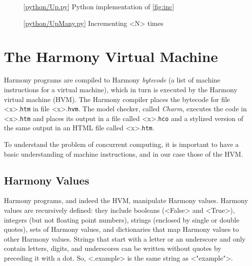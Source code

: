 \documentclass{report}
\newcommand{\harmonylink}[1]{%
[\href{https://harmony.cs.cornell.edu/#1}{\underline{#1}}]%
}
\newenvironment{code}{
\tcolorbox
}{
\endtcolorbox
}
\begin{document}
\begin{figure}
\begin{code}
\end{code}
\caption{\harmonylink{python/Up.py} Python implementation of \autoref{fig:inc}}
\label{fig:incpy}
\end{figure}

\begin{figure}
\begin{code}
\end{code}
\caption{\harmonylink{python/UpMany.py} Incrementing <{N}> times}
\label{fig:incmany}
\end{figure}

\chapter{The Harmony Virtual Machine}
\label{ch:harmonymachine}
%

Harmony programs are compiled to Harmony \emph{bytecode}
%
(a list of machine instructions for a virtual machine),
which in turn is executed by the Harmony virtual machine (HVM).
%
%
%
The Harmony compiler places the bytecode for file <{x}>.\texttt{htm} in
file <{x}>.\texttt{hvm}.
The model checker, called \emph{Charm}, executes the code in
<{x}>.\texttt{htm} and places its output in a file
called <{x}>.\texttt{hco} and a stylized version of the same output
in an HTML file called <{x}>.\texttt{htm}.

To understand the problem of concurrent computing, it
is important to have a basic understanding of machine instructions,
and in our case those of the HVM.

\section*{Harmony Values}

Harmony programs, and indeed the HVM,  manipulate Harmony values.
Harmony values are recursively defined:
they include booleans (<{False}> and <{True}>),
integers (but not floating point numbers),
strings (enclosed by single or double quotes),
sets of Harmony values, and dictionaries
%
that map Harmony values to other Harmony values.
Strings that start with a letter or an underscore and only contain
letters, digits, and underscores can be written without quotes by
preceding it with a dot.  So, <{.example}> is the same string
as <{"example"}>.
\end{document}

